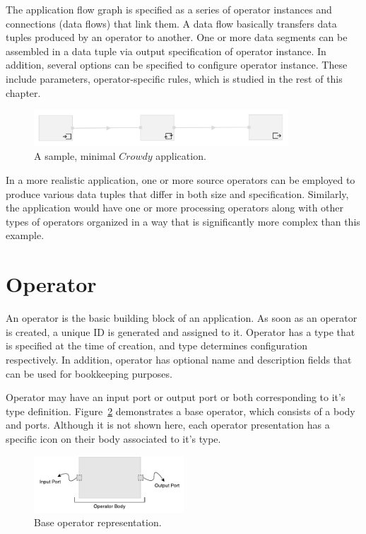 The application flow graph is specified as a series of operator instances and connections 
(data flows) that link them. A data flow basically transfers data tuples 
produced by an operator to another. One or more data segments can be assembled in a 
data tuple via output specification of operator instance. In addition, several options can 
be specified to configure operator instance. These include parameters, operator-specific 
rules, which is studied in the rest of this chapter.

\begin{figure}[ht]
	\centering
	\includegraphics[width=0.85\textwidth]{figures/helloworld.png}
	\caption{A sample, minimal $Crowdy$ application.}
	\label{fig:helloworld}
\end{figure}

In a more realistic application, one or more source operators can be employed to produce 
various data tuples that differ in both size and specification. Similarly, the application would 
have one or more processing operators along with other types of operators organized in a way 
that is significantly more complex than this example.

\section{Operator}
An operator is the basic building block of an application. As soon as an operator is created, 
a unique ID is generated and assigned to it. Operator has a type that is specified at the time of 
creation, and type determines configuration respectively. In addition, operator has optional 
name and description fields that can be used for bookkeeping purposes.

Operator may have an input port or output port or both corresponding to it's type 
definition. Figure~\ref{fig:basicoperator} demonstrates a base operator, which 
consists of a body and ports. Although it is not shown here, each operator presentation 
has a specific icon on their body associated to it's type.

\begin{figure}[ht]
	\centering
	\includegraphics[width=0.5\textwidth]{figures/basicoperator.pdf}
	\caption{Base operator representation.}
	\label{fig:basicoperator}
\end{figure}

